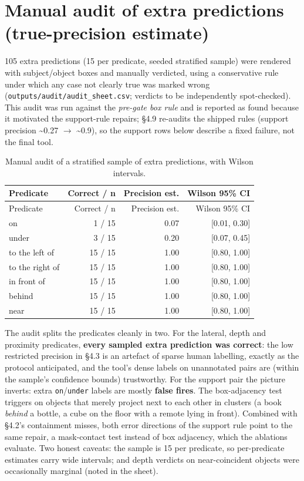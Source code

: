 \section{Manual audit of extra predictions (true-precision estimate)}

105 extra predictions (15 per predicate, seeded stratified sample) were rendered with subject/object boxes and manually verdicted, using a conservative rule under which any case not clearly true was marked wrong (\texttt{outputs/audit/audit\_sheet.csv}; verdicts to be independently spot-checked). This audit was run against the \textit{pre-gate box rule} and is reported as found because it motivated the support-rule repairs; \S4.9 re-audits the shipped rules (support precision \textasciitilde{}0.27 $\rightarrow$ \textasciitilde{}0.9), so the support rows below describe a fixed failure, not the final tool.

\begin{center}
\small
\begin{longtable}{lrrr}
\caption{Manual audit of a stratified sample of extra predictions, with Wilson intervals.}\\
\hline
Predicate & Correct / n & Precision est. & Wilson 95\% CI \\
\hline
\endfirsthead
\hline
Predicate & Correct / n & Precision est. & Wilson 95\% CI \\
\hline
\endhead
on & 1 / 15 & 0.07 & [0.01, 0.30] \\
under & 3 / 15 & 0.20 & [0.07, 0.45] \\
to the left of & 15 / 15 & 1.00 & [0.80, 1.00] \\
to the right of & 15 / 15 & 1.00 & [0.80, 1.00] \\
in front of & 15 / 15 & 1.00 & [0.80, 1.00] \\
behind & 15 / 15 & 1.00 & [0.80, 1.00] \\
near & 15 / 15 & 1.00 & [0.80, 1.00] \\
\hline
\end{longtable}
\end{center}

The audit splits the predicates cleanly in two. For the lateral, depth and proximity predicates, \textbf{every sampled extra prediction was correct}: the low restricted precision in \S4.3 is an artefact of sparse human labelling, exactly as the protocol anticipated, and the tool's dense labels on unannotated pairs are (within the sample's confidence bounds) trustworthy. For the support pair the picture inverts: extra \texttt{on}/\texttt{under} labels are mostly \textbf{false fires}. The box-adjacency test triggers on objects that merely project next to each other in clusters (a book \textit{behind} a bottle, a cube on the floor with a remote lying in front). Combined with \S4.2's containment misses, both error directions of the support rule point to the same repair, a mask-contact test instead of box adjacency, which the ablations evaluate. Two honest caveats: the sample is 15 per predicate, so per-predicate estimates carry wide intervals; and depth verdicts on near-coincident objects were occasionally marginal (noted in the sheet).

